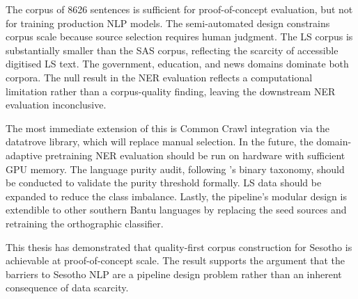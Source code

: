 \documentclass[12pt]{ThesisRU}
\begin{document}
The corpus of 8626 sentences is sufficient for proof-of-concept evaluation, but not for training production NLP models. The semi-automated design constrains corpus scale because source selection requires human judgment. The LS corpus is substantially smaller than the SAS corpus, reflecting the scarcity of accessible digitised LS text. The government, education, and news domains dominate both corpora. The null result in the NER evaluation reflects a computational limitation rather than a corpus-quality finding, leaving the downstream NER evaluation inconclusive.

The most immediate extension of this is Common Crawl integration via the datatrove library, which will replace manual selection. In the future, the domain-adaptive pretraining NER evaluation should be run on hardware with sufficient GPU memory. The language purity audit, following \citet{kreutzer-etal-2022-quality}'s binary taxonomy, should be conducted to validate the purity threshold formally. LS data should be expanded to reduce the class imbalance. Lastly, the pipeline's modular design is extendible to other southern Bantu languages by replacing the seed sources and retraining the orthographic classifier.

This thesis has demonstrated that quality-first corpus construction for Sesotho is achievable at proof-of-concept scale. The result supports the argument that the barriers to Sesotho NLP are a pipeline design problem rather than an inherent consequence of data scarcity.



\newpage
{}



\renewcommand{\chapterheadstartvskip}{\vspace*{-6\baselineskip}}
\end{document}

